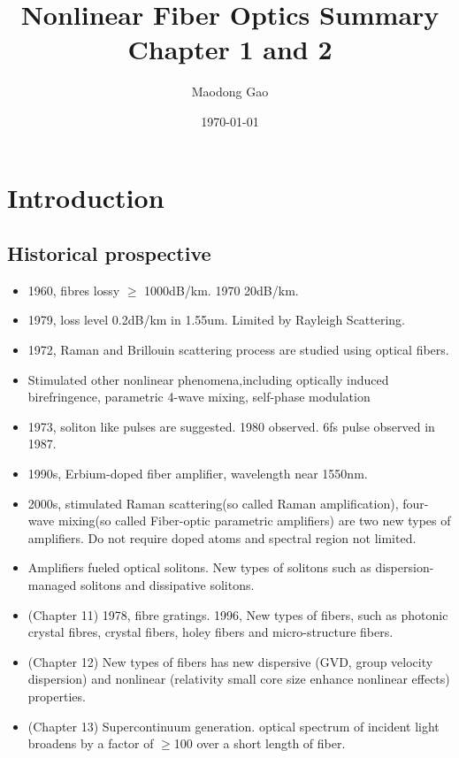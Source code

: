\documentclass[12pt]{extarticle}
\title{Nonlinear Fiber Optics\cite{agrawal_nonlinear_2007} Summary\\ Chapter 1 and 2}
\author{Maodong Gao}
\date{\today}
\numberwithin{equation}{section}
\numberwithin{figure}{section}
\numberwithin{table}{section}
\newcommand{\<}{\langle}
\renewcommand{\>}{\rangle}
\theoremstyle{definition}
\begin{document}
\maketitle
\tableofcontents
\newpage


\section{Introduction}
    \subsection{Historical prospective}
    
        \begin{itemize}
            \item 1960, fibres lossy $\geq$ 1000dB/km. 1970 20dB/km.
            \item 1979, loss level 0.2dB/km in 1.55um. Limited by Rayleigh Scattering.
            \item 1972, Raman and Brillouin scattering process are studied using optical fibers.
            \item Stimulated other nonlinear phenomena,including optically induced birefringence, parametric 4-wave mixing, self-phase modulation
            \item 1973, soliton like pulses are suggested. 1980 observed. 6fs pulse observed in 1987.
            \item 1990s, Erbium-doped fiber amplifier, wavelength near 1550nm.
            \item 2000s, stimulated Raman scattering(so called Raman amplification), four-wave mixing(so called Fiber-optic parametric amplifiers) are two new types of amplifiers. Do not require doped atoms and spectral region not limited.
            \item Amplifiers fueled optical solitons. New types of solitons such as dispersion-managed solitons and dissipative solitons.
            \item (Chapter 11) 1978, fibre gratings. 1996, New types of fibers, such as photonic crystal fibres, crystal fibers,  holey fibers and micro-structure fibers.
            \item (Chapter 12) New types of fibers has new dispersive (GVD, group velocity dispersion) and nonlinear (relativity small core size enhance nonlinear effects) properties.
            \item (Chapter 13) Supercontinuum generation. optical spectrum of incident light broadens by a factor of $\geq$100 over a short length of fiber.
        \end{itemize}
    
\end{document}
